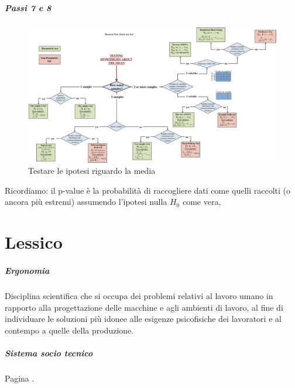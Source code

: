 \documentclass[11pt,a4paper]{book}
\begin{document}
\paragraph{Passi 7 e 8}
\begin{figure}[h!]
	\begin{center}
		\includegraphics[scale=0.1]{img/030.png}
		\caption{Testare le ipotesi riguardo la media}
		\label{fig: 030}
	\end{center}
\end{figure}

Ricordiamo: il p-value è la probabilità di raccogliere dati come quelli raccolti (o ancora più estremi) assumendo l'ipotesi nulla $H_0$ come vera,



\chapter{Lessico} 
\paragraph{Ergonomia}
Disciplina scientifica che si occupa dei problemi relativi al lavoro umano in rapporto alla progettazione delle macchine e agli ambienti di lavoro, al fine di individuare le soluzioni più idonee alle esigenze psicofisiche dei lavoratori e al contempo a quelle della produzione.

\paragraph{Sistema socio tecnico}
Pagina \pageref{par: sistema sociotecnico}.
\end{document}
